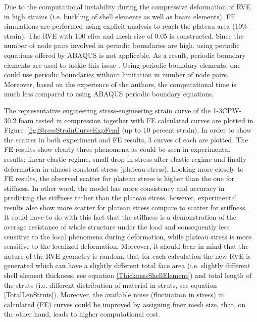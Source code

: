 \documentclass[review]{elsarticle}
\begin{document}
Due to the computational instability during the compressive deformation of RVE in high strains (i.e. buckling of shell elements as well as beam elements), FE simulations are performed using explicit analysis to reach the plateau area (10\% strain). The RVE with 100 clles and mesh size of 0.05 is constructed. Since the number of node pairs involved in periodic boundaries are high, using periodic equations offered by ABAQUS is not applicable. As a result, periodic boundary elements are used to tackle this issue \citep{SergioSabadoThesis}. Using periodic boundary elements, one could use periodic boundaries without limitation in number of node pairs. Moreover, based on the experience of the authors, the computational time is much less compared to using ABAQUS periodic boundary equations. 

The representative engineering stress-engineering strain curve of the 1-3CPW- 30.2 foam tested in compression together with FE calculated curves are plotted in Figure~\ref{fig:StressStrainCurveExpFem} (up to 10 percent strain). In order to show the scatter in both experiment and FE results, 3 curves of each are plotted. The FE results show clearly three phenomena as could be seen in experimental results: linear elastic regime, small drop in stress after elastic regime and finally deformation in almost constant stress (plateau stress). Looking more closely to FE results, the observed scatter for plateau stress is higher than the one for stiffness. In other word, the model has more consistency and accuracy in predicting the stiffness rather than the plateau stress, however, experimental results also show more scatter for plateau stress compare to scatter for stiffness. It could have to do with this fact that the stiffness is a demonstration of the average resistance of whole structure under the load and consequently less sensitive to the local phenomena during deformation, while plateau stress is more sensitive to the localized deformation. Moreover, it should bear in mind that the nature of the RVE geometry is random, that for each calculation the new RVE is generated which can have a slightly different total face area (i.e. slightly different shell element thickness, see equation \ref{ThicknessShellElement}) and total length of the struts (i.e. different distribution of material in struts, see equation \ref{TotalLenStruts}). Moreover, the available noise (fluctuation in stress) in calculated (FE) curves could be improved by assigning finer mesh size, that, on the other hand, leads to higher computational cost.
\end{document}
